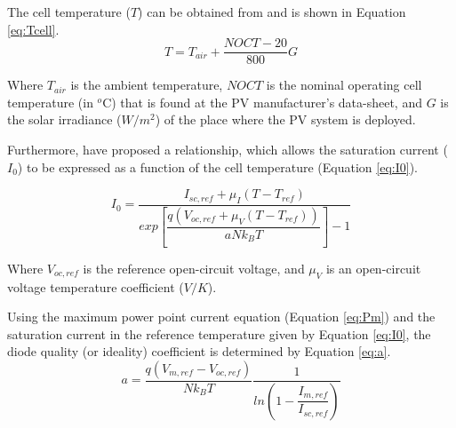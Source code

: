 \documentclass[journal]{IEEEtran}
\begin{document}
The cell temperature ($ T $) can be obtained from \cite{Ross} and is shown in Equation \ref{eq:Tcell}.
\begin{equation}
\label{eq:Tcell}
T = T_{air} + \dfrac{NOCT-20}{800}G
\end{equation}

Where $ T_{air} $ is the ambient temperature, $NOCT$ is the nominal operating cell temperature (in $^{o}$C) that is found at the PV manufacturer's data-sheet, and $G$ is the solar irradiance ($ W/m^{2} $) of the place where the PV system is deployed.

Furthermore, \cite{Villalva} have proposed a relationship, which allows the saturation current ($ I_{0} $) to be expressed as a function of the cell temperature (Equation \ref{eq:I0}). 

\begin{equation}
\label{eq:I0}
I_{0} = \dfrac{I_{sc,ref} + \mu_{I}(T - T_{ref})}{exp \left[ \dfrac{q(V_{oc,ref} + \mu_{V} (T - T_{ref}))}{aNk_{B}T}    \right] -1}
\end{equation}

Where $ V_{oc,ref} $ is the reference open-circuit voltage, and $ \mu_{V} $ is an open-circuit voltage temperature coefficient ($ V/K $).

Using the maximum power point current equation (Equation \ref{eq:Pm}) and the saturation current in the reference temperature given by Equation \ref{eq:I0}, the diode quality (or ideality) coefficient is determined by Equation \ref{eq:a}.
\begin{equation}
\label{eq:a}
a = \dfrac{q(V_{m,ref}-V_{oc,ref})}{Nk_{B}T} \dfrac{1}{ln \left( 1 - \dfrac{I_{m,ref}}{I_{sc,ref}}  \right) }
\end{equation}
\end{document}
